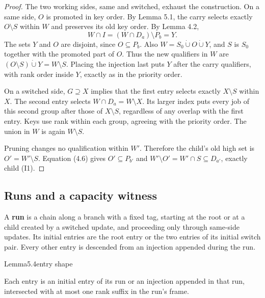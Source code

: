 \begin{proof}
The two working sides, same and switched, exhaust the construction. On a same side, \(O\) is promoted in key order. By Lemma 5.1, the carry selects exactly \(O\setminus S\) within \(W\) and preserves its old key order. By Lemma 4.2, \[
W\cap I=(W\cap D_a)\setminus P_b=Y.
\] The sets \(Y\) and \(O\) are disjoint, since \(O\subseteq P_b\). Also \(W=S_0\dot\cup O\dot\cup Y\), and \(S\) is \(S_0\) together with the promoted part of \(O\). Thus the new qualifiers in \(W\) are \((O\setminus S)\dot\cup Y=W\setminus S\). Placing the injection last puts \(Y\) after the carry qualifiers, with rank order inside \(Y\), exactly as in the priority order.

On a switched side, \(G\supseteq X\) implies that the first entry selects exactly \(X\setminus S\) within \(X\). The second entry selects \(W\cap D_a=W\setminus X\). Its larger index puts every job of this second group after those of \(X\setminus S\), regardless of any overlap with the first entry. Keys use rank within each group, agreeing with the priority order. The union in \(W\) is again \(W\setminus S\).

Pruning changes no qualification within \(W'\). Therefore the child's old high set is \(O'=W'\setminus S\). Equation (4.6) gives \(O'\subseteq P_{b'}\) and \(W'\setminus O'=W'\cap S\subseteq D_{a'}\), exactly child (I1).
\end{proof}

\subsection{Runs and a capacity witness}

A \textbf{run} is a chain along a branch with a fixed tag, starting at the root or at a child created by a switched update, and proceeding only through same-side updates. Its initial entries are the root entry or the two entries of its initial switch pair. Every other entry is descended from an injection appended during the run.

\begin{numbered}{Lemma}{5.4}{entry shape}

Each entry is an initial entry of its run or an injection appended in that run, intersected with at most one rank suffix in the run's frame.

\end{numbered}

